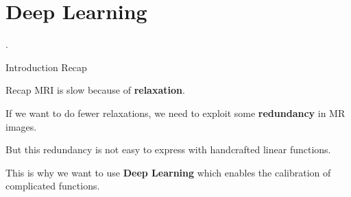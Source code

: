 \section{Deep Learning}

\begin{frame}[plain,c]

    \begin{center}
        \color{DarkBlue}
    \Huge \thesection. \insertsection
    \end{center}

\end{frame}




\begin{frame}{Introduction Recap}
    \begin{block}{Recap}
        MRI is slow because of \textbf{relaxation}.

        \pause
        If we want to do fewer relaxations, we need to exploit some \textbf{redundancy} in MR images.

        \pause
        But this redundancy is not easy to express with handcrafted linear functions.

        \pause
        This is why we want to use \textbf{Deep Learning} which enables the calibration of complicated functions.
    \end{block}
\end{frame}
